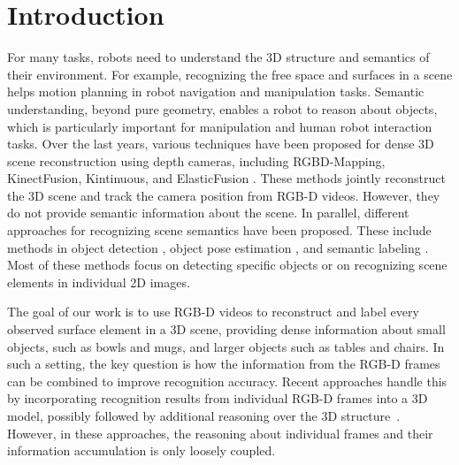 \documentclass[conference]{IEEEtran}
\begin{document}
\IEEEpeerreviewmaketitle

\section{Introduction}

For many tasks, robots need to understand the 3D structure and semantics of their environment. For example, recognizing the free space and surfaces in a scene helps motion planning in robot navigation and manipulation tasks. Semantic understanding, beyond pure geometry, enables a robot to reason about objects, which is particularly important for manipulation and human robot interaction tasks. Over the last years, various techniques have been proposed for dense 3D scene reconstruction using depth cameras, including RGBD-Mapping, KinectFusion, Kintinuous, and ElasticFusion \cite{henry2012rgb,newcombe2011kinectfusion,Whe12Kin,whelan2015elasticfusion}.  These methods jointly reconstruct the 3D scene and track the camera position from RGB-D videos. However, they do not provide semantic information about the scene. In parallel, different approaches for recognizing scene semantics have been proposed. These include methods in object detection \cite{felzenszwalb2008discriminatively,girshick2014rich}, object pose estimation \cite{brachmann2014learning,savarese20073d,xiang2012estimating}, and semantic labeling \cite{ren2012rgb,long2015fully}. Most of these methods focus on detecting specific objects or on recognizing scene elements in individual 2D images.

The goal of our work is to use RGB-D videos to reconstruct and label every observed surface element in a 3D scene, providing dense information about small objects, such as bowls and mugs, and larger objects such as tables and chairs. In such a setting, the key question is how the information from the RGB-D frames can be combined to improve recognition accuracy. Recent approaches handle this by incorporating recognition results from individual RGB-D frames into a 3D model, possibly followed by additional reasoning over the 3D structure~\cite{Lai13Obj,lai2014unsupervised,mccormac2016semanticfusion}. However, in these approaches, the reasoning about individual frames and their information accumulation is only loosely coupled.
\end{document}
